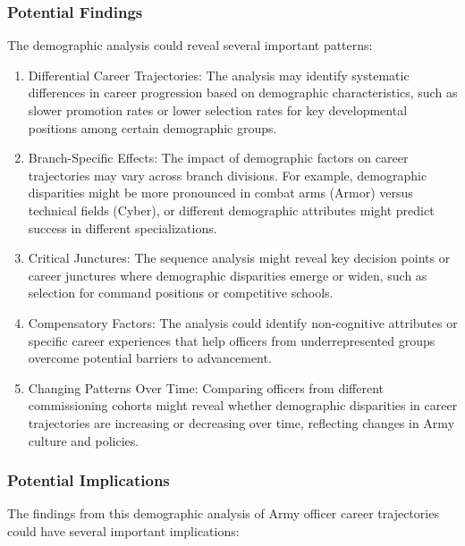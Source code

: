\documentclass[
  letterpaper,
  DIV=11,
  numbers=noendperiod]{scrartcl}
\begin{document}
\subsubsection{Potential Findings}\label{potential-findings}

The demographic analysis could reveal several important patterns:

\begin{enumerate}
\def\labelenumi{\arabic{enumi}.}
\item
  Differential Career Trajectories: The analysis may identify systematic
  differences in career progression based on demographic
  characteristics, such as slower promotion rates or lower selection
  rates for key developmental positions among certain demographic
  groups.
\item
  Branch-Specific Effects: The impact of demographic factors on career
  trajectories may vary across branch divisions. For example,
  demographic disparities might be more pronounced in combat arms
  (Armor) versus technical fields (Cyber), or different demographic
  attributes might predict success in different specializations.
\item
  Critical Junctures: The sequence analysis might reveal key decision
  points or career junctures where demographic disparities emerge or
  widen, such as selection for command positions or competitive schools.
\item
  Compensatory Factors: The analysis could identify non-cognitive
  attributes or specific career experiences that help officers from
  underrepresented groups overcome potential barriers to advancement.
\item
  Changing Patterns Over Time: Comparing officers from different
  commissioning cohorts might reveal whether demographic disparities in
  career trajectories are increasing or decreasing over time, reflecting
  changes in Army culture and policies.
\end{enumerate}

\subsubsection{Potential Implications}\label{potential-implications}

The findings from this demographic analysis of Army officer career
trajectories could have several important implications:
\end{document}
